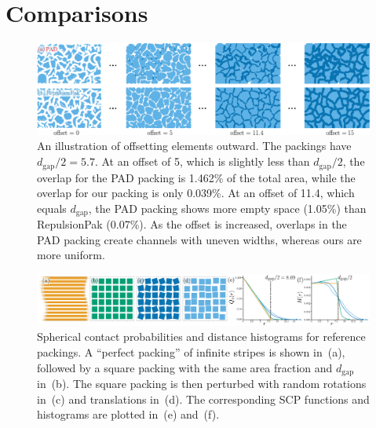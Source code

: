 \section{Comparisons}


\begin{figure}
\centering
\includegraphics[width=1.0\textwidth]{figures/metrics/overlap_metric.pdf}
\caption[An illustration of offsetting elements outward]
{\label{fig_overlap_function}
    An illustration of offsetting elements outward. The packings have $d_\mathrm{gap} / 2 = 5.7$.  
    At an offset of 5, which is slightly less than $d_\mathrm{gap} / 2$,
    the overlap for the PAD packing is 1.462\% of the total area, while the overlap for our packing is only 0.039\%.
    At an offset of 11.4, which equals $d_\mathrm{gap}$, the PAD packing shows more empty space (1.05\%) than RepulsionPak (0.07\%).
    As the offset is increased, overlaps in the PAD packing create channels
  with uneven widths, whereas ours are more uniform.
  }
\end{figure}

\begin{figure}
\centering
\includegraphics[width=1.0\textwidth]{figures/metrics/hsr_viz.pdf}
\caption[Spherical contact probabilities and distance histograms \newline for reference packings]
{\label{hsr_viz}
Spherical contact probabilities and distance histograms for 
reference packings.
A ``perfect packing'' of infinite stripes is shown in~(a),
followed by a square packing with the same area fraction and $d_\mathrm{gap}$
in~(b).  The square packing is then perturbed with random rotations in~(c)
and translations in~(d). The corresponding SCP functions and histograms are plotted
in~(e) and~(f).}
\end{figure}

